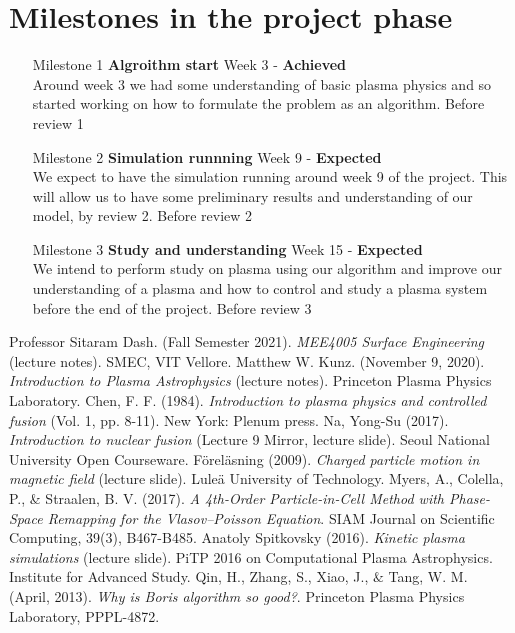 \documentclass[12pt]{article}
\begin{document}
	\section{Milestones in the project phase}
	\begin{enumerate}
		\item[Milestone 1] \textbf{Algroithm start} \hspace*{\fill} Week 3 - \textbf{Achieved}\\
		Around week 3 we had some understanding of basic plasma physics and so started working on how to formulate the problem as an algorithm. \hspace*{\fill} Before review 1
		\item[Milestone 2] \textbf{Simulation runnning}
		\hspace*{\fill} Week 9 - \textbf{Expected}\\
		We expect to have the simulation running around week 9 of the project. This will allow us to have some preliminary results and understanding of our model, by review 2. \hspace*{\fill} Before review 2 \phantom{a}
		\item[Milestone 3] \textbf{Study and understanding}	
		\hspace*{\fill} Week 15 - \textbf{Expected} \\
		We intend to perform study on plasma using our algorithm and improve our understanding of a plasma and how to control and study a plasma system before the end of the project. \hspace*{\fill} Before review 3
	\end{enumerate}
	
	
	\begin{thebibliography}{}
		Professor Sitaram Dash. (Fall Semester 2021). \textit{MEE4005 Surface Engineering} (lecture notes). SMEC, VIT Vellore.
		Matthew W. Kunz. (November 9, 2020). \textit{Introduction to Plasma Astrophysics} (lecture notes). Princeton Plasma Physics Laboratory.
		Chen, F. F. (1984). \textit{Introduction to plasma physics and controlled fusion} (Vol. 1, pp. 8-11). New York: Plenum press.
		Na, Yong-Su (2017). \textit{Introduction to nuclear fusion} (Lecture 9 Mirror, lecture slide). Seoul National University Open Courseware.
		F\"{o}rel\"{a}sning (2009). \textit{Charged particle motion in magnetic field} (lecture slide). Lule\"{a} University of Technology.
		Myers, A., Colella, P., \& Straalen, B. V. (2017). \textit{A 4th-Order Particle-in-Cell Method with Phase-Space Remapping for the Vlasov--Poisson Equation}. SIAM Journal on Scientific Computing, 39(3), B467-B485.
		Anatoly Spitkovsky (2016). \textit{Kinetic plasma simulations} (lecture slide). PiTP 2016 on Computational Plasma Astrophysics. Institute for Advanced Study.
		Qin, H., Zhang, S., Xiao, J., $\&$ Tang, W. M. (April, 2013). \textit{Why is Boris algorithm so good?}. Princeton Plasma Physics Laboratory, PPPL-4872.
		
	\end{thebibliography}
\end{document}
